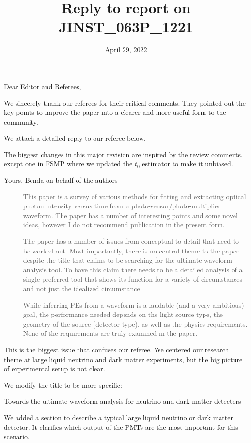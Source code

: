 \documentclass[12pt]{article}
\title{Reply to report on JINST\_063P\_1221}
\date{April 29, 2022}
\begin{document}
\maketitle
Dear Editor and Referees,

We sincerely thank our referees for their critical comments.  They
pointed out the key points to improve the paper into a clearer and
more useful form to the community.

We attach a detailed reply to our referee below.

The biggest changes in this major revision are inspired by the review
comments, except one in FSMP where we updated the $t_0$ estimator to
make it unbiased.

Yours,
Benda on behalf of the authors

\begin{quote}
This paper is a survey of various methods for fitting and extracting optical photon intensity versus time from a photo-sensor/photo-multiplier waveform. The paper has a number of interesting points and some novel ideas, however I do not recommend publication in the present form.

The paper has a number of issues from conceptual to detail that need to be worked out. Most importantly, there is no central theme to the paper despite the title that claims to be searching for the ultimate waveform analysis tool. To have this claim there needs to be a detailed analysis of a single preferred tool that shows its function for a variety of circumstances and not just the idealized circumstance.

While inferring PEs from a waveform is a laudable (and a very ambitious) goal, the performance needed depends on the light source type, the geometry of the source (detector type), as well as the physics requirements. None of the requirements are truly examined in the paper.
\end{quote}

This is the biggest issue that confuses our referee.  We centered our research theme at large liquid neutrino and dark matter experiments, but the big picture of experimental setup is not clear.

We modify the title to be more specific:

Towards the ultimate waveform analysis for neutrino and dark matter detectors

We added a section to describe a typical large liquid neutrino or dark matter detector.  It clarifies which output of the PMTs are the most important for this scenario.
\end{document}
